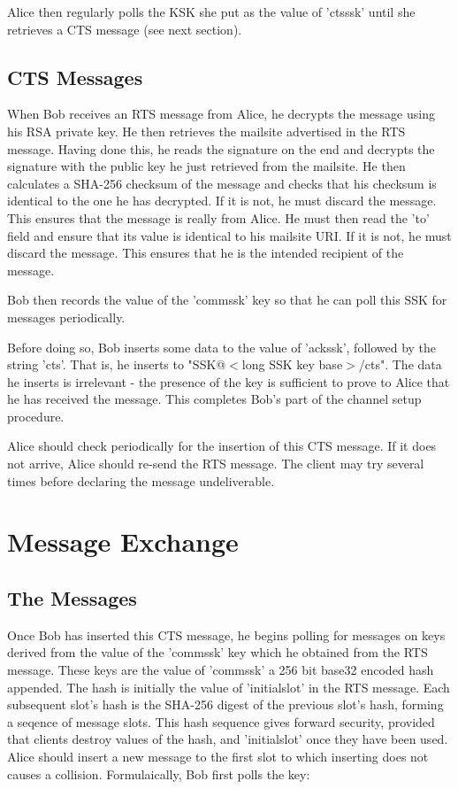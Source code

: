 \documentclass[12pt,a4paper]{article}
\begin{document}
Alice then regularly polls the KSK she put as the value of 'ctsssk' until she retrieves a CTS
message (see next section).

\subsection{CTS Messages}
When Bob receives an RTS message from Alice, he decrypts the message using his RSA private key. He
then retrieves the mailsite advertised in the RTS message. Having done this, he reads the signature
on the end and decrypts the signature with the public key he just retrieved from the mailsite. He
then calculates a SHA-256 checksum of the message and checks that his checksum is identical to the
one he has decrypted. If it is not, he must discard the message. This ensures that the message is
really from Alice. He must then read the 'to' field and ensure that its value is identical to his
mailsite URI. If it is not, he must discard the message. This ensures that he is the intended
recipient of the message.

Bob then records the value of the 'commssk' key so that he can poll this SSK for messages
periodically.

Before doing so, Bob inserts some data to the value of 'ackssk', followed by the string 'cts'. That
is, he inserts to "SSK@$<$long SSK key base$>$/cts". The data he inserts is irrelevant - the
presence of the key is sufficient to prove to Alice that he has received the message. This completes
Bob's part of the channel setup procedure.

Alice should check periodically for the insertion of this CTS message. If it does not arrive, Alice
should re-send the RTS message. The client may try several times before declaring the message
undeliverable.

\section{Message Exchange}
\subsection{The Messages}
Once Bob has inserted this CTS message, he begins polling for messages on keys derived from the
value of the 'commssk' key which he obtained from the RTS message. These keys are the value of
'commssk' a 256 bit base32 encoded hash appended. The hash is initially the value of 'initialslot'
in the RTS message. Each subsequent slot's hash is the SHA-256 digest of the previous slot's hash,
forming a seqence of message slots. This hash sequence gives forward security, provided that clients
destroy values of the hash, and 'initialslot' once they have been used. Alice should insert a new
message to the first slot to which inserting does not causes a collision. Formulaically, Bob first
polls the key:
\end{document}
